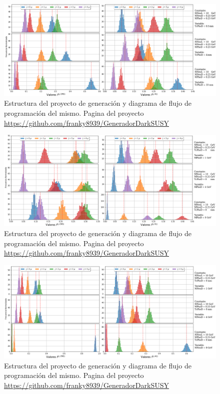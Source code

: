 \begin{figure}[ht]
\centering
\includegraphics[width=1\textwidth]{Simulacion/imagenes/Distribucion_Entries.png}
\caption{Estructura del proyecto de generación y diagrama de flujo de programación del mismo. Pagina del proyecto \url{https://github.com/franky8939/GeneradorDarkSUSY}}
\label{entradas1}
\end{figure}


\begin{figure}[ht]
\centering
\includegraphics[width=1\textwidth]{Simulacion/imagenes/Distribucion_Entries2.png}
\caption{Estructura del proyecto de generación y diagrama de flujo de programación del mismo. Pagina del proyecto \url{https://github.com/franky8939/GeneradorDarkSUSY}}
\label{entradas2}
\end{figure}


\begin{figure}[ht]
\centering
\includegraphics[width=1\textwidth]{Simulacion/imagenes/Distribucion_Entries3.png}
\caption{Estructura del proyecto de generación y diagrama de flujo de programación del mismo. Pagina del proyecto \url{https://github.com/franky8939/GeneradorDarkSUSY}}
\label{entradas3}
\end{figure}




